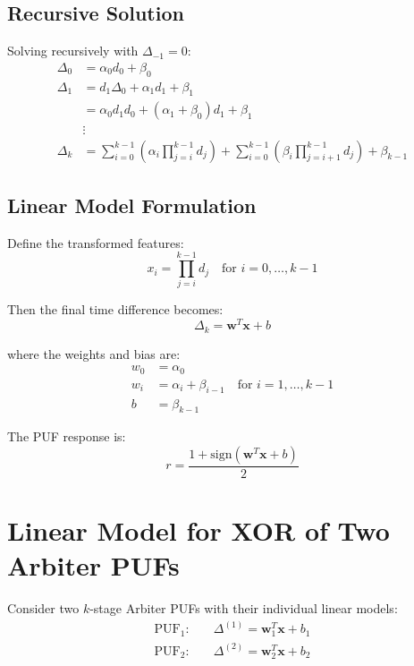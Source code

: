\documentclass[11pt]{article}
\begin{document}
\subsection{Recursive Solution}

Solving recursively with $\Delta_{-1} = 0$:
\begin{align*}
\Delta_0 &= \alpha_0 d_0 + \beta_0 \\
\Delta_1 &= d_1\Delta_0 + \alpha_1 d_1 + \beta_1 \\
&= \alpha_0 d_1 d_0 + (\alpha_1 + \beta_0)d_1 + \beta_1 \\
&\vdots \\
\Delta_k &= \sum_{i=0}^{k-1} \left(\alpha_i \prod_{j=i}^{k-1} d_j\right) + \sum_{i=0}^{k-1} \left(\beta_i \prod_{j=i+1}^{k-1} d_j\right) + \beta_{k-1}
\end{align*}

\subsection{Linear Model Formulation}

Define the transformed features:
\begin{equation*}
x_i = \prod_{j=i}^{k-1} d_j \quad \text{for } i = 0,\ldots,k-1
\end{equation*}

Then the final time difference becomes:
\begin{equation*}
\Delta_k = \mathbf{w}^T\mathbf{x} + b
\end{equation*}

where the weights and bias are:
\begin{align*}
w_0 &= \alpha_0 \\
w_i &= \alpha_i + \beta_{i-1} \quad \text{for } i = 1,\ldots,k-1 \\
b &= \beta_{k-1}
\end{align*}

The PUF response is:
\begin{equation*}
r = \frac{1 + \text{sign}(\mathbf{w}^T\mathbf{x} + b)}{2}
\end{equation*}

\section{Linear Model for XOR of Two Arbiter PUFs}

Consider two $k$-stage Arbiter PUFs with their individual linear models:
\begin{align*}
\text{PUF}_1: & \quad \Delta^{(1)} = \mathbf{w}_1^T\mathbf{x} + b_1 \\
\text{PUF}_2: & \quad \Delta^{(2)} = \mathbf{w}_2^T\mathbf{x} + b_2
\end{align*}
\end{document}
